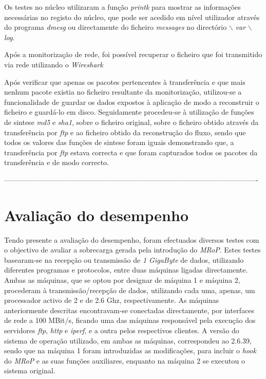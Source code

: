 Os testes no núcleo utilizaram a função \textit{printk} para mostrar as informações necessárias no registo do núcleo, que pode ser acedido em nível utilizador através do programa \textit{dmesg} ou directamente do ficheiro \textit{messages} no directório $\backslash$ \textit{var} $\backslash$ \textit{log}.

Após a monitorização de rede, foi possível recuperar o ficheiro que foi transmitido via rede utilizando o \textit{Wireshark}


Após verificar que apenas os pacotes pertencentes à transferência e que mais nenhum pacote existia no ficheiro resultante da monitorização, utilizou-se a funcionalidade de guardar os dados expostos à aplicação de modo a reconstruir o ficheiro e guardá-lo em disco.
Seguidamente procedeu-se à utilização de funções de sintese \textit{md5} e \textit{sha1}, sobre o ficheiro original, sobre o ficheiro obtido através da transferência por \textit{ftp} e ao ficheiro obtido da reconstrução do fluxo, sendo que todos os valores das funções de sintese foram iguais demonstrando que, a transferência por \textit{ftp} estava correcta e que foram capturados todos os pacotes da transferência e de modo correcto.




----------------------------------------------------------------------------------------------------------


\section{Avaliação do desempenho}
\label{sec:eval_performance}

Tendo presente a avaliação do desempenho, foram efectuados diversos testes com o objectivo de avaliar a sobrecarga gerada pela introdução do \textit{MRoP}.
Estes testes basearam-se na recepção ou transmissão de \textit{1 GigaByte} de dados, utilizando diferentes programas e protocolos, entre duas máquinas ligadas directamente.
Ambas as máquinas, que se optou por designar de máquina 1 e máquina 2, procederam à transmissão/recepção de dados, utilizando cada uma, apenas, um processador activo de 2 e de 2.6 Ghz, respectivamente.
As máquinas anteriormente descritas encontravam-se conectadas directamente, por interfaces de rede a 100 MBit/s, ficando uma das máquinas responsável pela execução dos servidores \textit{ftp}, \textit{http} e \textit{iperf}, e a outra pelos respectivos clientes.
A versão do sistema de operação utilizado, em ambas as máquinas, correspondeu ao 2.6.39, sendo que na máquina 1 foram introduzidas as modificações, para incluir o \textit{hook} do \textit{MRoP} e as suas funções auxiliares, enquanto na máquina 2 se executou o sistema original.

